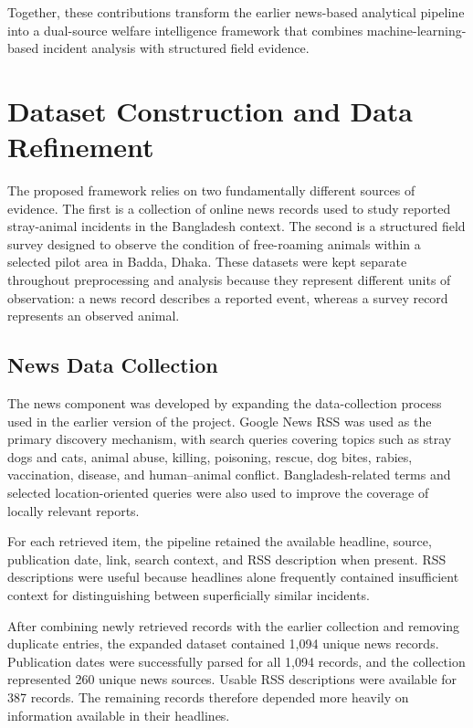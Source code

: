 \documentclass[conference]{IEEEtran}
\begin{document}
Together, these contributions transform the earlier news-based analytical
pipeline into a dual-source welfare intelligence framework that combines
machine-learning-based incident analysis with structured field evidence.%



\section{Dataset Construction and Data Refinement}

The proposed framework relies on two fundamentally different sources of
evidence. The first is a collection of online news records used to study
reported stray-animal incidents in the Bangladesh context. The second is a
structured field survey designed to observe the condition of free-roaming
animals within a selected pilot area in Badda, Dhaka. These datasets were
kept separate throughout preprocessing and analysis because they represent
different units of observation: a news record describes a reported event,
whereas a survey record represents an observed animal.

\subsection{News Data Collection}

The news component was developed by expanding the data-collection process
used in the earlier version of the project. Google News RSS was used as the
primary discovery mechanism, with search queries covering topics such as
stray dogs and cats, animal abuse, killing, poisoning, rescue, dog bites,
rabies, vaccination, disease, and human--animal conflict. Bangladesh-related
terms and selected location-oriented queries were also used to improve the
coverage of locally relevant reports.

For each retrieved item, the pipeline retained the available headline,
source, publication date, link, search context, and RSS description when
present. RSS descriptions were useful because headlines alone frequently
contained insufficient context for distinguishing between superficially
similar incidents.

After combining newly retrieved records with the earlier collection and
removing duplicate entries, the expanded dataset contained 1,094 unique news
records. Publication dates were successfully parsed for all 1,094 records,
and the collection represented 260 unique news sources. Usable RSS
descriptions were available for 387 records. The remaining records therefore
depended more heavily on information available in their headlines.
\end{document}
